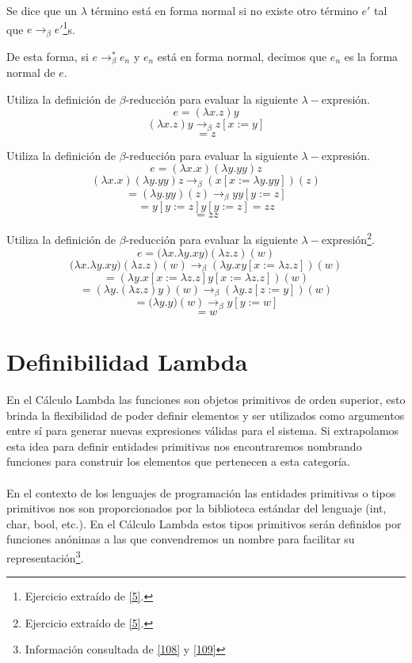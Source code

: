 	    \begin{definition} Se dice que un $\lambda$ término está en forma normal si no existe otro término $e'$ tal que $e\to_\beta e'$\footnote{Ejercicio extraído de \hyperlink{5}{[5]}.}s.

    De esta forma, si $e\to_\beta^*e_n$ y $e_n$ está en forma normal, decimos que $e_n$ es la forma normal de $e$. 
    \end{definition}    

    \begin{exercise}
    Utiliza la definición de $\beta$-reducción para evaluar la siguiente $\lambda-$expresión.
    $$e= (\lambda x.z)y$$
    \[ (\lambda x.z)y \rightarrow_\beta  z [x := y]\]
    \[ = z \]
    \end{exercise}

    \begin{exercise}
        Utiliza la definición de $\beta$-reducción para evaluar la siguiente $\lambda-$expresión.
        $$e = (\lambda x.x)(\lambda y.yy) z$$
        \[ (\lambda x.x)(\lambda y.yy) z \rightarrow_\beta (x[x:=\lambda y.yy])(z)\]
        \[ = (\lambda y.yy)(z) \rightarrow_\beta yy[y:=z]\]
        \[ =  y[y:=z]y[y:=z] = zz\]
       \[= zz \]
    \end{exercise}

    \begin{exercise}
        Utiliza la definición de $\beta$-reducción para evaluar la siguiente $\lambda-$expresión\footnote{Ejercicio extraído de \hyperlink{5}{[5]}.}.
        $$e= \big(\lambda x.\lambda y.xy\big)(\lambda z.z)(w)$$
        \[\big(\lambda x.\lambda y.xy\big)(\lambda z.z)(w) \rightarrow_\beta (\lambda y.xy[x := \lambda z.z])(w) \]
        \[ =  (\lambda y.x[x := \lambda z.z]y[x := \lambda z.z])(w) \]
	 \[ = (\lambda y.(\lambda z.z)y)(w)  \rightarrow_\beta (\lambda y.z[z := y])(w) \]
        \[ = \big(\lambda y.y\big)(w) \rightarrow_\beta y[y := w] \]
        \[ = w \]
    \end{exercise}

    \section{Definibilidad Lambda}
    En el Cálculo Lambda las funciones son objetos primitivos de orden superior, esto brinda la flexibilidad de poder definir elementos y ser utilizados como argumentos entre sí para generar nuevas expresiones válidas para el sistema. Si extrapolamos esta idea para definir entidades primitivas nos encontraremos nombrando funciones para construir los elementos que pertenecen a esta categoría.\\\\
 En el contexto de los lenguajes de programación las entidades primitivas o tipos primitivos nos son proporcionados por la biblioteca estándar del lenguaje (\textsf{int}, \textsf{char}, \textsf{boo}l, etc.). En el Cálculo Lambda estos tipos primitivos serán definidos por funciones anónimas a las que convendremos un nombre para facilitar su representación\footnote{Información consultada de \hyperlink{108}{[108]} y  \hyperlink{109}{[109]}}.

